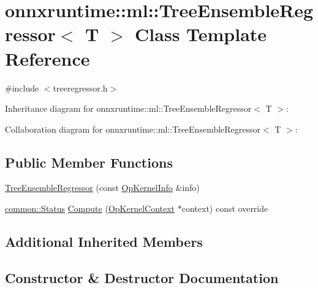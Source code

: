 \hypertarget{classonnxruntime_1_1ml_1_1TreeEnsembleRegressor}{}\section{onnxruntime\+:\+:ml\+:\+:Tree\+Ensemble\+Regressor$<$ T $>$ Class Template Reference}
\label{classonnxruntime_1_1ml_1_1TreeEnsembleRegressor}


{\ttfamily \#include $<$treeregressor.\+h$>$}



Inheritance diagram for onnxruntime\+:\+:ml\+:\+:Tree\+Ensemble\+Regressor$<$ T $>$\+:


Collaboration diagram for onnxruntime\+:\+:ml\+:\+:Tree\+Ensemble\+Regressor$<$ T $>$\+:
\subsection*{Public Member Functions}
\begin{DoxyCompactItemize}
\item 
\mbox{\hyperlink{classonnxruntime_1_1ml_1_1TreeEnsembleRegressor_a6fb03dda3b2b294d4e32722e34d6ef78}{Tree\+Ensemble\+Regressor}} (const \mbox{\hyperlink{classonnxruntime_1_1OpKernelInfo}{Op\+Kernel\+Info}} \&info)
\item 
\mbox{\hyperlink{classonnxruntime_1_1common_1_1Status}{common\+::\+Status}} \mbox{\hyperlink{classonnxruntime_1_1ml_1_1TreeEnsembleRegressor_afdc48697c40a7754dde84ba91dd36b3b}{Compute}} (\mbox{\hyperlink{classonnxruntime_1_1OpKernelContext}{Op\+Kernel\+Context}} $\ast$context) const override
\end{DoxyCompactItemize}
\subsection*{Additional Inherited Members}


\subsection{Constructor \& Destructor Documentation}
\mbox{\label{classonnxruntime_1_1ml_1_1TreeEnsembleRegressor_a6fb03dda3b2b294d4e32722e34d6ef78}} 
